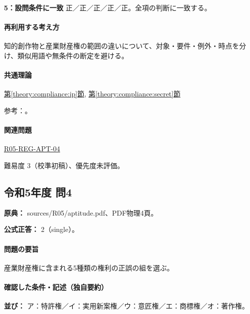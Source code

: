 \noindent\textbf{5：設問条件に一致} 正／正／正／正／正。全項の判断に一致する。\par

\paragraph{再利用する考え方} 知的創作物と産業財産権の範囲の違いについて、対象・要件・例外・時点を分け、類似用語や無条件の断定を避ける。

\paragraph{共通理論} \hyperref[theory:compliance:ip]{第\ref*{theory:compliance:ip}節}, \hyperref[theory:compliance:secret]{第\ref*{theory:compliance:secret}節}

\par 参考：\cite{ip_basic_act,jpo_ip_overview,meti_trade_secret}。

\paragraph{関連問題} \hyperref[q:r05-reg-apt-04]{R05-REG-APT-04}

\par 難易度 3（校準初稿）、優先度未評価。

\subsection{令和5年度 問4}
\label{q:r05-reg-apt-04}

\noindent\textbf{原典：} sources/R05/aptitude.pdf、PDF物理4頁。

\textbf{公式正答：} 2（single）。

\paragraph{問題の要旨} 産業財産権に含まれる5種類の権利の正誤の組を選ぶ。

\paragraph{確認した条件・記述（独自要約）}\mbox{}\par

\noindent\textbf{並び：} ア：特許権／イ：実用新案権／ウ：意匠権／エ：商標権／オ：著作権。\par

